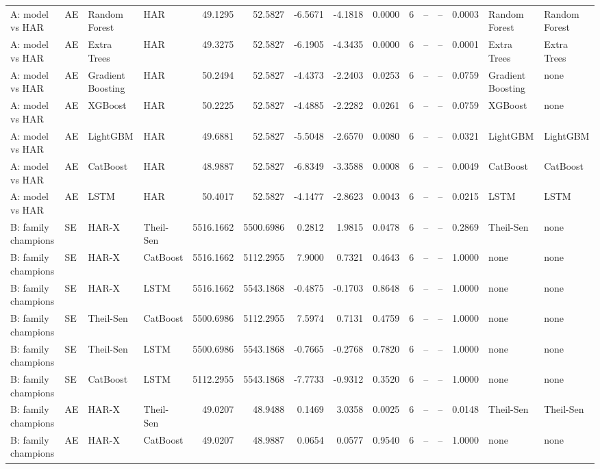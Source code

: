 \begin{table}[htbp]
{\begin{tabular}{llllrrrrrrrrrll}
A: model vs HAR & AE & Random Forest & HAR & 49.1295 & 52.5827 & -6.5671 & -4.1818 & 0.0000 & 6 & -- & -- & 0.0003 & Random Forest & Random Forest \\
A: model vs HAR & AE & Extra Trees & HAR & 49.3275 & 52.5827 & -6.1905 & -4.3435 & 0.0000 & 6 & -- & -- & 0.0001 & Extra Trees & Extra Trees \\
A: model vs HAR & AE & Gradient Boosting & HAR & 50.2494 & 52.5827 & -4.4373 & -2.2403 & 0.0253 & 6 & -- & -- & 0.0759 & Gradient Boosting & none \\
A: model vs HAR & AE & XGBoost & HAR & 50.2225 & 52.5827 & -4.4885 & -2.2282 & 0.0261 & 6 & -- & -- & 0.0759 & XGBoost & none \\
A: model vs HAR & AE & LightGBM & HAR & 49.6881 & 52.5827 & -5.5048 & -2.6570 & 0.0080 & 6 & -- & -- & 0.0321 & LightGBM & LightGBM \\
A: model vs HAR & AE & CatBoost & HAR & 48.9887 & 52.5827 & -6.8349 & -3.3588 & 0.0008 & 6 & -- & -- & 0.0049 & CatBoost & CatBoost \\
A: model vs HAR & AE & LSTM & HAR & 50.4017 & 52.5827 & -4.1477 & -2.8623 & 0.0043 & 6 & -- & -- & 0.0215 & LSTM & LSTM \\
B: family champions & SE & HAR-X & Theil-Sen & 5516.1662 & 5500.6986 & 0.2812 & 1.9815 & 0.0478 & 6 & -- & -- & 0.2869 & Theil-Sen & none \\
B: family champions & SE & HAR-X & CatBoost & 5516.1662 & 5112.2955 & 7.9000 & 0.7321 & 0.4643 & 6 & -- & -- & 1.0000 & none & none \\
B: family champions & SE & HAR-X & LSTM & 5516.1662 & 5543.1868 & -0.4875 & -0.1703 & 0.8648 & 6 & -- & -- & 1.0000 & none & none \\
B: family champions & SE & Theil-Sen & CatBoost & 5500.6986 & 5112.2955 & 7.5974 & 0.7131 & 0.4759 & 6 & -- & -- & 1.0000 & none & none \\
B: family champions & SE & Theil-Sen & LSTM & 5500.6986 & 5543.1868 & -0.7665 & -0.2768 & 0.7820 & 6 & -- & -- & 1.0000 & none & none \\
B: family champions & SE & CatBoost & LSTM & 5112.2955 & 5543.1868 & -7.7733 & -0.9312 & 0.3520 & 6 & -- & -- & 1.0000 & none & none \\
B: family champions & AE & HAR-X & Theil-Sen & 49.0207 & 48.9488 & 0.1469 & 3.0358 & 0.0025 & 6 & -- & -- & 0.0148 & Theil-Sen & Theil-Sen \\
B: family champions & AE & HAR-X & CatBoost & 49.0207 & 48.9887 & 0.0654 & 0.0577 & 0.9540 & 6 & -- & -- & 1.0000 & none & none \\

\end{tabular}}
\end{table}
